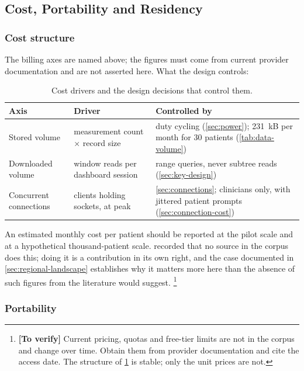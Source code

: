 \documentclass[12pt,a4paper,oneside]{report}
\newcommand{\verify}[1]{\footnote{\textbf{[To verify]} #1}}
\begin{document}
\subsection{Cost, Portability and Residency}\label{sec:cost}

\subsubsection{Cost structure}

The billing axes are named above; the figures must come from current provider documentation and are not asserted here. What the design controls:

\begin{table}[htbp]
\centering\small
\caption{Cost drivers and the design decisions that control them.}\label{tab:cost-drivers}
\begin{tabularx}{\textwidth}{@{}>{\raggedright\arraybackslash}p{3.4cm} >{\raggedright\arraybackslash}p{3.8cm} X@{}}
\toprule
\textbf{Axis} & \textbf{Driver} & \textbf{Controlled by} \\
\midrule
Stored volume & measurement count $\times$ record size & duty cycling (\cref{sec:power}); 231~kB per month for 30 patients (\cref{tab:data-volume}) \\
Downloaded volume & window reads per dashboard session & range queries, never subtree reads (\cref{sec:key-design}) \\
Concurrent connections & clients holding sockets, at peak & \cref{sec:connections}; clinicians only, with jittered patient prompts (\cref{sec:connection-cost}) \\
\bottomrule
\end{tabularx}
\end{table}

An estimated monthly cost per patient should be reported at the pilot scale and at a hypothetical thousand-patient scale.  recorded that no source in the corpus does this; doing it is a contribution in its own right, and the case documented in \cref{sec:regional-landscape} establishes why it matters more here than the absence of such figures from the literature would suggest.%
\verify{Current pricing, quotas and free-tier limits are not in the corpus and change over time. Obtain them from provider documentation and cite the access date. The structure of \cref{tab:cost-drivers} is stable; only the unit prices are not.}

\subsubsection{Portability}
\end{document}
